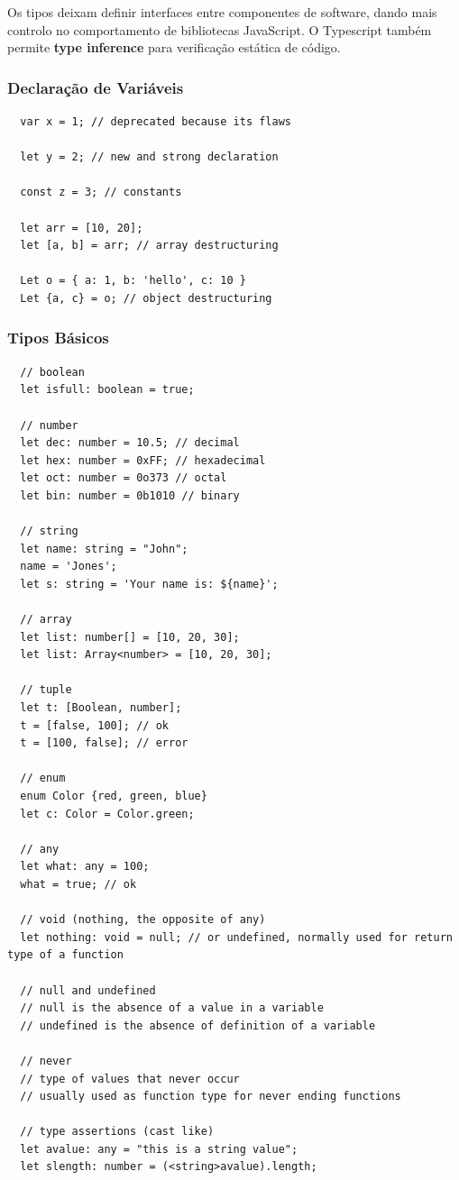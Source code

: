 \documentclass{article}
\begin{document}
Os tipos deixam definir interfaces entre componentes de software, dando mais
controlo no comportamento de bibliotecas JavaScript.
O Typescript também permite \textbf{type inference} para verificação
estática de código.

\subsubsection{Declaração de Variáveis}

\begin{lstlisting}
  var x = 1; // deprecated because its flaws

  let y = 2; // new and strong declaration

  const z = 3; // constants

  let arr = [10, 20];
  let [a, b] = arr; // array destructuring

  Let o = { a: 1, b: 'hello', c: 10 }
  Let {a, c} = o; // object destructuring
\end{lstlisting}

\pagebreak

\subsubsection{Tipos Básicos}

\begin{lstlisting}
  // boolean
  let isfull: boolean = true;

  // number
  let dec: number = 10.5; // decimal
  let hex: number = 0xFF; // hexadecimal
  let oct: number = 0o373 // octal
  let bin: number = 0b1010 // binary

  // string
  let name: string = "John";
  name = 'Jones';
  let s: string = 'Your name is: ${name}';

  // array
  let list: number[] = [10, 20, 30];
  let list: Array<number> = [10, 20, 30];

  // tuple
  let t: [Boolean, number];
  t = [false, 100]; // ok
  t = [100, false]; // error

  // enum
  enum Color {red, green, blue}
  let c: Color = Color.green;

  // any
  let what: any = 100;
  what = true; // ok

  // void (nothing, the opposite of any)
  let nothing: void = null; // or undefined, normally used for return type of a function

  // null and undefined
  // null is the absence of a value in a variable
  // undefined is the absence of definition of a variable

  // never
  // type of values that never occur
  // usually used as function type for never ending functions

  // type assertions (cast like)
  let avalue: any = "this is a string value";
  let slength: number = (<string>avalue).length;
\end{lstlisting}
\end{document}

